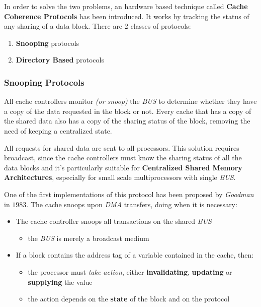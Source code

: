 \documentclass[english]{article}
\begin{document}
In order to solve the two problems, an hardware based technique called \textbf{Cache Coherence Protocols} has been introduced.
It works by tracking the status of any sharing of a data block.
There are \(2\) classes of protocols:

\begin{enumerate}
  \item \textbf{Snooping} protocols
  \item \textbf{Directory Based} protocols
\end{enumerate}

\subsubsection{Snooping Protocols}

All cache controllers monitor \textit{(or snoop)} the \textit{BUS} to determine whether they have a copy of the data requested in the block or not.
Every cache that has a copy of the shared data also has a copy of the sharing status of the block, removing the need of keeping a centralized state.

All requests for shared data are sent to all processors.
This solution requires broadcast, since the cache controllers must know the sharing status of all the data blocks and it's particularly suitable for \textbf{Centralized Shared Memory Architectures}, especially for small scale multiprocessors with single \textit{BUS}.

\bigskip
One of the first implementations of this protocol has been proposed by \textit{Goodman} in \(1983\).
The cache snoops upon \textit{DMA} transfers, doing  when it is necessary:

\begin{itemize}
  \item The cache controller snoops all transactions on the shared \textit{BUS}
  \begin{itemize}
    \item the \textit{BUS} is merely a broadcast medium
  \end{itemize}
  \item If a block contains the address tag of a variable contained in the cache, then:
        \begin{itemize}
          \item the processor must \textit{take action}, either \textbf{invalidating}, \textbf{updating} or \textbf{supplying} the value
          \item the action depends on the \textbf{state} of the block and on the protocol
        \end{itemize}
\end{itemize}
\end{document}
